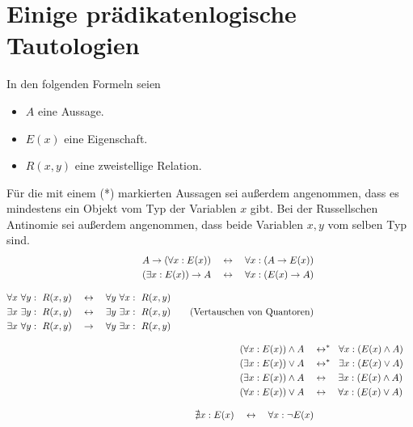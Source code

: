 \section{Einige prädikatenlogische Tautologien}
In den folgenden Formeln seien
\begin{itemize}
    \item $A$ eine Aussage.
    \item $E(x)$ eine Eigenschaft.
    \item $R(x,y)$ eine zweistellige Relation.
\end{itemize}
Für die mit einem (*) markierten Aussagen sei außerdem angenommen, dass es mindestens ein Objekt vom Typ der Variablen $x$ gibt. Bei der Russellschen Antinomie sei außerdem angenommen, dass beide Variablen $x,y$ vom selben Typ sind.
\begingroup
\allowdisplaybreaks
\begin{align*}
    \begin{split}
        A \to (\forall x : E(x)) \quad & \leftrightarrow\quad \forall x : (A \to E(x)) \\
        (\exists x : E(x)) \to A \quad & \leftrightarrow\quad \forall x : (E(x) \to A)
    \end{split} \\[0.8em]
    \begin{split}
        \forall x\ \forall y:\ R(x,y) \quad & \leftrightarrow\quad \forall y\ \forall x:\ R(x,y) \\
        \exists x\ \exists y:\ R(x,y) \quad & \leftrightarrow\quad \exists y\ \exists x:\ R(x,y) \\
        \exists x\ \forall y:\ R(x,y) \quad & \to\quad \forall y\ \exists x:\ R(x,y)
    \end{split} \tag{Vertauschen von Quantoren} \\[0.8em]
    (\forall x : E(x)) \land A \quad & \leftrightarrow^* \quad\hspace{-.4em} \forall x :(E(x) \land A) \\
    (\exists x : E(x)) \lor A \quad & \leftrightarrow^* \quad\hspace{-.4em} \exists x : (E(x) \lor A) \\
    (\exists x : E(x)) \land A \quad & \leftrightarrow\quad \exists x : (E(x) \land A) \\
    (\forall x : E(x)) \lor A \quad & \leftrightarrow\quad \forall x :(E(x) \lor A) \\[0.8em] %
    \begin{split}
        \nexists x: E(x) \quad & \leftrightarrow\quad \forall x: \neg E(x) \\

\end{split}
\end{align*}
